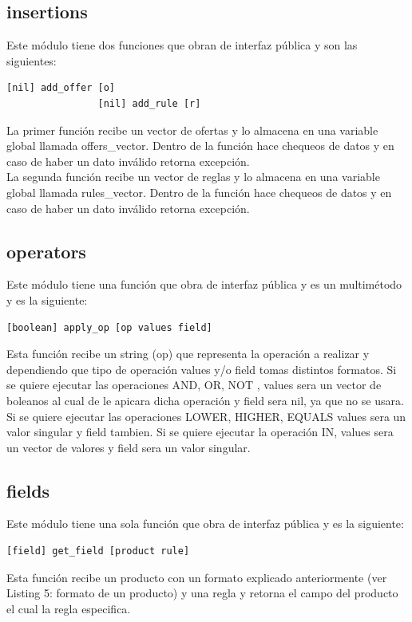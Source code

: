 \documentclass[a4paper, 12pt]{article}
\begin{document}
		\subsection{insertions}
			Este módulo tiene dos funciones que obran de interfaz pública y son las siguientes:
			\begin{lstlisting}[frame=tb, caption=firmas de la interfaz pública, label=zebra, tabsize=1]
				[nil] add_offer [o]
				[nil] add_rule [r]
			\end{lstlisting}
			La primer función recibe un vector de ofertas y lo almacena en una variable global llamada offers\_vector. Dentro de la 			función hace chequeos de datos y en caso de haber un dato inválido retorna excepción.\\
			La segunda función recibe un vector de reglas y lo almacena en una variable global llamada rules\_vector. Dentro de la 				función hace chequeos de datos y en caso de haber un dato inválido retorna excepción.\\
		\newpage
		\subsection{operators}
			Este módulo tiene una función que obra de interfaz pública y es un multimétodo y es la siguiente:
			\begin{lstlisting}[frame=tb, caption=firmas de la interfaz pública, label=zebra, tabsize=1]
				[boolean] apply_op [op values field]
			\end{lstlisting}
			Esta función recibe un string (op) que representa la operación a realizar y dependiendo que tipo de operación values
			y/o field tomas distintos formatos. Si se quiere ejecutar las operaciones AND, OR, NOT , values sera un vector de 				boleanos al cual de le apicara dicha operación y field sera nil, ya que no se usara. Si se quiere ejecutar las 				operaciones LOWER, HIGHER, EQUALS values sera un valor singular y field tambien. Si se quiere ejecutar la operación IN, 			values sera un vector de valores y field sera un valor singular.

		\newpage
		\subsection{fields}
			Este módulo tiene una sola función que obra de interfaz pública y es la siguiente:
			\begin{lstlisting}[frame=tb, caption=firmas de la interfaz pública, label=zebra, tabsize=1]
				[field] get_field [product rule]
			\end{lstlisting}
			Esta función recibe un producto	con un formato explicado anteriormente (ver Listing 5: formato de un producto) y una 				regla y retorna el campo del producto el cual la regla especifica.\\
\end{document}
